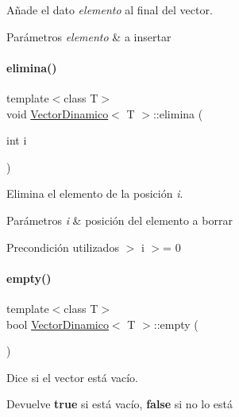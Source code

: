 Añade el dato {\itshape elemento} al final del vector. 


\begin{DoxyParams}{Parámetros}
{\em elemento} & a insertar \\
\hline
\end{DoxyParams}
\mbox{\label{classVectorDinamico_a7becfff8694e770512c00d4d5761dcbb}} 
\paragraph{\texorpdfstring{elimina()}{elimina()}}
{\footnotesize\ttfamily template$<$class T$>$ \\
void \hyperlink{classVectorDinamico}{Vector\+Dinamico}$<$ T $>$\+::elimina (\begin{DoxyParamCaption}\item[{int}]{i }\end{DoxyParamCaption})}



Elimina el elemento de la posición {\itshape i}. 


\begin{DoxyParams}{Parámetros}
{\em i} & posición del elemento a borrar \\
\hline
\end{DoxyParams}
\begin{DoxyPrecond}{Precondición}
utilizados $>$ i $>$= 0 
\end{DoxyPrecond}
\mbox{\label{classVectorDinamico_a2402366c111d0b5b23343b53289418fb}} 
\paragraph{\texorpdfstring{empty()}{empty()}}
{\footnotesize\ttfamily template$<$class T$>$ \\
bool \hyperlink{classVectorDinamico}{Vector\+Dinamico}$<$ T $>$\+::empty (\begin{DoxyParamCaption}{ }\end{DoxyParamCaption})}



Dice si el vector está vacío. 

\begin{DoxyReturn}{Devuelve}
{\bfseries true} si está vacío, {\bfseries false} si no lo está 
\end{DoxyReturn}
\mbox{\label{classVectorDinamico_a09af4a2ad69cd099ff8dc17befca89a0}} 
